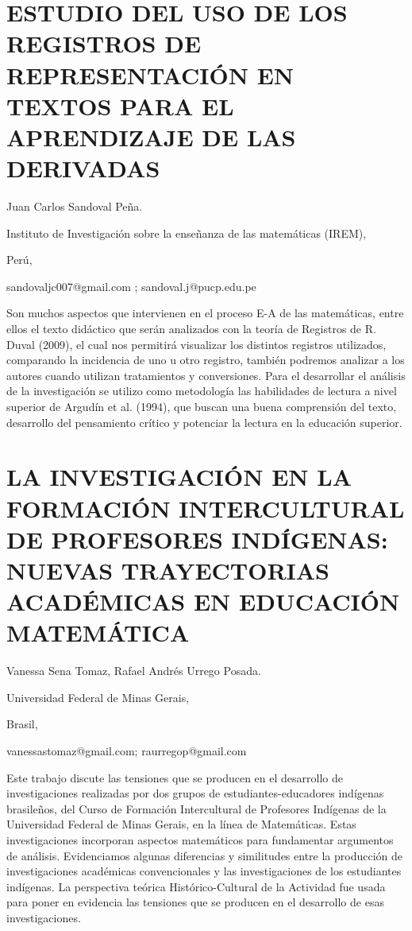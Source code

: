 \setcounter{section}{193}


\section{ESTUDIO DEL USO DE LOS REGISTROS DE REPRESENTACIÓN EN TEXTOS PARA
EL APRENDIZAJE DE LAS DERIVADAS}

\begin{datos}

Juan Carlos Sandoval Peña.

Instituto de Investigación sobre la enseñanza de las matemáticas (IREM),

Perú,

sandovaljc007@gmail.com ; sandoval.j@pucp.edu.pe

\end{datos}

Son muchos aspectos que intervienen en el proceso E-A de las matemáticas,
entre ellos el texto didáctico que serán analizados con la teoría
de Registros de R. Duval (2009), el cual nos permitirá visualizar
los distintos registros utilizados, comparando la incidencia de uno
u otro registro, también podremos analizar a los autores cuando utilizan
tratamientos y conversiones. Para el desarrollar el análisis de la
investigación se utilizo como metodología las habilidades de lectura
a nivel superior de Argudín et al. (1994), que buscan una buena comprensión
del texto, desarrollo del pensamiento crítico y potenciar la lectura
en la educación superior.


\section{LA INVESTIGACIÓN EN LA FORMACIÓN INTERCULTURAL DE PROFESORES INDÍGENAS:
NUEVAS TRAYECTORIAS ACADÉMICAS EN EDUCACIÓN MATEMÁTICA}

\begin{datos}

Vanessa Sena Tomaz, Rafael Andrés Urrego Posada.

Universidad Federal de Minas Gerais,

Brasil,

vanessastomaz@gmail.com; raurregop@gmail.com 

\end{datos}

Este trabajo discute las tensiones que se producen en el desarrollo
de investigaciones realizadas por dos grupos de estudiantes-educadores
indígenas brasileños, del Curso de Formación Intercultural de Profesores
Indígenas de la Universidad Federal de Minas Gerais, en la línea de
Matemáticas. Estas investigaciones incorporan aspectos matemáticos
para fundamentar argumentos de análisis. Evidenciamos algunas diferencias
y similitudes entre la producción de investigaciones académicas convencionales
y las investigaciones de los estudiantes indígenas. La perspectiva
teórica Histórico-Cultural de la Actividad fue usada para poner en
evidencia las tensiones que se producen en el desarrollo de esas investigaciones. 


